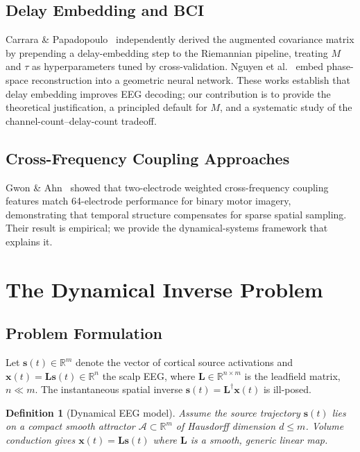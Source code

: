 \documentclass[journal]{IEEEtran}
\newtheorem{definition}{Definition}
\newcommand{\R}{\mathbb{R}}
\newcommand{\bx}{\mathbf{x}}
\newcommand{\bs}{\mathbf{s}}
\newcommand{\bL}{\mathbf{L}}
\newcommand{\calA}{\mathcal{A}}
\begin{document}
\subsection{Delay Embedding and BCI}
Carrara \& Papadopoulo~\cite{carrara2023} independently derived the augmented covariance matrix by prepending a delay-embedding step to the Riemannian pipeline, treating $M$ and $\tau$ as hyperparameters tuned by cross-validation. Nguyen et al.~\cite{nguyen2024} embed phase-space reconstruction into a geometric neural network. These works establish that delay embedding improves EEG decoding; our contribution is to provide the theoretical justification, a principled default for $M$, and a systematic study of the channel-count--delay-count tradeoff.

\subsection{Cross-Frequency Coupling Approaches}
Gwon \& Ahn~\cite{gwon2021} showed that two-electrode weighted cross-frequency coupling features match 64-electrode performance for binary motor imagery, demonstrating that temporal structure compensates for sparse spatial sampling. Their result is empirical; we provide the dynamical-systems framework that explains it.

\section{The Dynamical Inverse Problem}
\label{sec:theory}

\subsection{Problem Formulation}
Let $\bs(t) \in \R^m$ denote the vector of cortical source activations and $\bx(t) = \bL\bs(t) \in \R^n$ the scalp EEG, where $\bL \in \R^{n \times m}$ is the leadfield matrix, $n \ll m$. The instantaneous spatial inverse $\bs(t) = \bL^\dagger \bx(t)$ is ill-posed.

\begin{definition}[Dynamical EEG model]
Assume the source trajectory $\bs(t)$ lies on a compact smooth attractor $\calA \subset \R^m$ of Hausdorff dimension $d \leq m$. Volume conduction gives $\bx(t) = \bL\bs(t)$ where $\bL$ is a smooth, generic linear map.
\end{definition}
\end{document}
